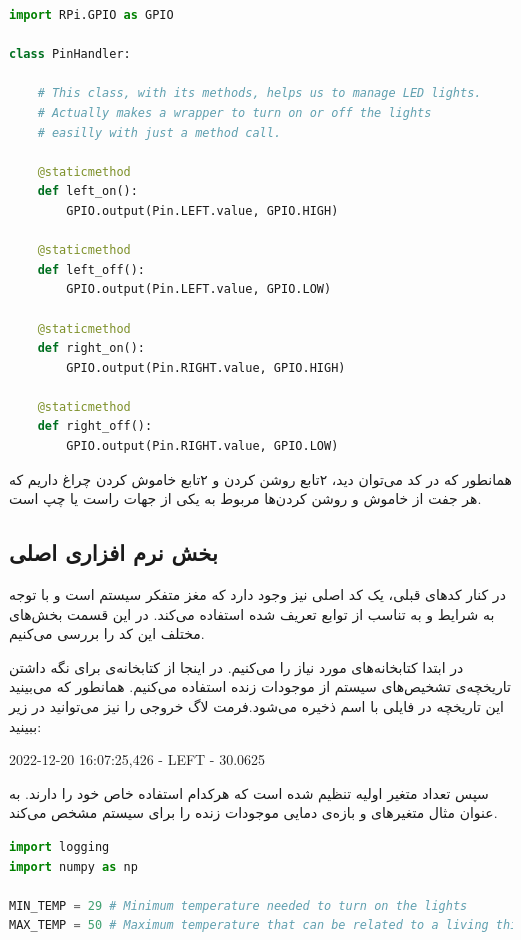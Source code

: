 \begin{latin}
\begin{lstlisting}[language=python]
import RPi.GPIO as GPIO

class PinHandler:

    # This class, with its methods, helps us to manage LED lights.
    # Actually makes a wrapper to turn on or off the lights
    # easilly with just a method call.

    @staticmethod
    def left_on():
        GPIO.output(Pin.LEFT.value, GPIO.HIGH)

    @staticmethod
    def left_off():
        GPIO.output(Pin.LEFT.value, GPIO.LOW)

    @staticmethod
    def right_on():
        GPIO.output(Pin.RIGHT.value, GPIO.HIGH)

    @staticmethod
    def right_off():
        GPIO.output(Pin.RIGHT.value, GPIO.LOW)


\end{lstlisting}
\end{latin}

همانطور که در کد می‌توان دید، ۲تابع روشن کردن و ۲تابع خاموش کردن چراغ داریم که هر جفت از خاموش و روشن کردن‌ها مربوط به یکی از جهات راست یا چپ است.

\subsection{بخش نرم افزاری اصلی}
در کنار کد‌های قبلی، یک کد اصلی نیز وجود دارد که مغز متفکر سیستم است و با توجه به شرایط و به تناسب از توابع تعریف شده استفاده می‌کند. در این قسمت بخش‌های مختلف این کد را بررسی‌ می‌کنیم.

در ابتدا کتابخانه‌های مورد نیاز را  می‌کنیم. در اینجا از کتابخانه‌ی  برای نگه داشتن تاریخچه‌ی تشخیص‌های سیستم از موجودات زنده استفاده می‌کنیم. همانطور که می‌بینید این تاریخچه در فایلی با اسم  ذخیره می‌شود.فرمت لاگ خروجی را نیز می‌توانید در زیر ببینید:

\begin{latin}
    2022-12-20 16:07:25,426 - LEFT - 30.0625
\end{latin}

سپس تعداد متغیر اولیه تنظیم شده است که هرکدام استفاده خاص خود را دارند. به عنوان مثال متغیرهای  و  بازه‌ی دمایی موجودات زنده را برای سیستم مشخص می‌کند.

\begin{latin}
\begin{lstlisting}[language=python]
import logging
import numpy as np

MIN_TEMP = 29 # Minimum temperature needed to turn on the lights
MAX_TEMP = 50 # Maximum temperature that can be related to a living thing

\end{lstlisting}
\end{latin}

